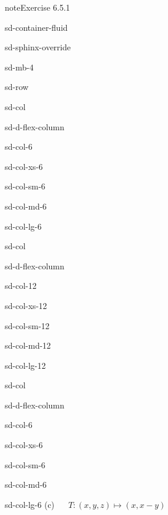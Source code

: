\documentclass[letterpaper,10pt,english]{jupyterBook}
\begin{document}
\begin{sphinxadmonition}{note}{Exercise 6.5.1}
\begin{sphinxuseclass}{sd-container-fluid}
\begin{sphinxuseclass}{sd-sphinx-override}
\begin{sphinxuseclass}{sd-mb-4}
\begin{sphinxuseclass}{sd-row}
\begin{sphinxuseclass}{sd-col}
\begin{sphinxuseclass}{sd-d-flex-column}
\begin{sphinxuseclass}{sd-col-6}
\begin{sphinxuseclass}{sd-col-xs-6}
\begin{sphinxuseclass}{sd-col-sm-6}
\begin{sphinxuseclass}{sd-col-md-6}
\begin{sphinxuseclass}{sd-col-lg-6}
\end{sphinxuseclass}
\end{sphinxuseclass}
\end{sphinxuseclass}
\end{sphinxuseclass}
\end{sphinxuseclass}
\end{sphinxuseclass}
\end{sphinxuseclass}
\begin{sphinxuseclass}{sd-col}
\begin{sphinxuseclass}{sd-d-flex-column}
\begin{sphinxuseclass}{sd-col-12}
\begin{sphinxuseclass}{sd-col-xs-12}
\begin{sphinxuseclass}{sd-col-sm-12}
\begin{sphinxuseclass}{sd-col-md-12}
\begin{sphinxuseclass}{sd-col-lg-12}
\sphinxAtStartPar
 

\end{sphinxuseclass}
\end{sphinxuseclass}
\end{sphinxuseclass}
\end{sphinxuseclass}
\end{sphinxuseclass}
\end{sphinxuseclass}
\end{sphinxuseclass}
\begin{sphinxuseclass}{sd-col}
\begin{sphinxuseclass}{sd-d-flex-column}
\begin{sphinxuseclass}{sd-col-6}
\begin{sphinxuseclass}{sd-col-xs-6}
\begin{sphinxuseclass}{sd-col-sm-6}
\begin{sphinxuseclass}{sd-col-md-6}
\begin{sphinxuseclass}{sd-col-lg-6}
\sphinxAtStartPar
(c)   \(T: (x, y, z) \mapsto (x, x - y)\)


\end{sphinxuseclass}
\end{sphinxuseclass}
\end{sphinxuseclass}
\end{sphinxuseclass}
\end{sphinxuseclass}
\end{sphinxuseclass}
\end{sphinxuseclass}
\end{sphinxuseclass}
\end{sphinxuseclass}
\end{sphinxuseclass}
\end{sphinxuseclass}
\end{sphinxadmonition}
\end{document}
